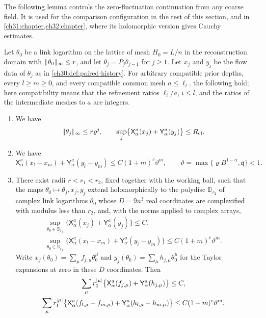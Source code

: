 The following lemma controls the zero-fluctuation continuation from any coarse field. It is used for the comparison configuration in the rest of this section, and in \cref{ch31:chapter,ch32:chapter}, where its holomorphic version gives Cauchy estimates.

\begin{lemma}\label{ch30:lem:zero-white-and-chaining}
Let $\theta_0$ be a link logarithm on the lattice of mesh $H_0=L/n$ in the reconstruction domain with $\lVert \theta_0\rVert_\infty\le r$, and let $\theta_j=P_j\theta_{j-1}$ for $j\ge1$. Let $x_j$ and $y_j$ be the flow data of $\theta_j$ as in \cref{ch30:def:paired-history}. For arbitrary compatible prior depths, every $l\ge m\ge0$, and every compatible common mesh $a\le\ell_l$, the following hold; here compatibility means that the refinement ratios $\ell_i/a$, $i\le l$, and the ratios of the intermediate meshes to $a$ are integers.
\begin{enumerate}
\item We have
\[
 \lVert \theta_j\rVert_\infty\le r\varrho^j,\qquad
 \sup_j\bigl\{\mathsf X_\alpha^a(x_j)+\mathsf Y_\alpha^a(y_j)\bigr\}\le R_{\mathrm{cl}}.
\]
\item We have
\[
 \mathsf X_\alpha^a(x_l-x_m)+\mathsf Y_\alpha^a(y_l-y_m)\le C(1+m)^c\vartheta^m,\qquad
 \vartheta=\max\{\varrho B^{1-\alpha},\mathfrak q\}<1.
\]
\item There exist radii $r<r_1<r_2$, fixed together with the working ball, such that the maps $\theta_0\mapsto\theta_j,x_j,y_j$ extend holomorphically to the polydisc $\mathbb D_{r_2}$ of complex link logarithms $\theta_0$ whose $D=9n^3$ real coordinates are complexified with modulus less than $r_2$, and, with the norms applied to complex arrays,
\[
 \begin{gathered}
 \sup_{\theta_0\in\mathbb D_{r_2}}\bigl\{\mathsf X_\alpha^a(x_j)+\mathsf Y_\alpha^a(y_j)\bigr\}\le C,\\
 \sup_{\theta_0\in\mathbb D_{r_2}}\bigl\{\mathsf X_\alpha^a(x_l-x_m)+\mathsf Y_\alpha^a(y_l-y_m)\bigr\}\le C(1+m)^c\vartheta^m .
 \end{gathered}
\]
Write $x_j(\theta_0)=\sum_\mu f_{j,\mu}\theta_0^\mu$ and $y_j(\theta_0)=\sum_\mu h_{j,\mu}\theta_0^\mu$ for the Taylor expansions at zero in these $D$ coordinates. Then
\[
 \begin{gathered}
 \sum_\mu r_1^{\abs\mu}\bigl\{\mathsf X_\alpha^a(f_{j,\mu})+\mathsf Y_\alpha^a(h_{j,\mu})\bigr\}\le C,\\
 \sum_\mu r_1^{\abs\mu}\bigl\{\mathsf X_\alpha^a(f_{l,\mu}-f_{m,\mu})+\mathsf Y_\alpha^a(h_{l,\mu}-h_{m,\mu})\bigr\}\le C(1+m)^c\vartheta^m .

\end{gathered}\]
\end{enumerate}
\end{lemma}
